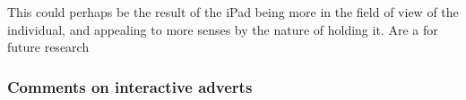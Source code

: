 	This could perhaps be the result of the iPad being more in the field of view of the individual, and appealing to more senses by the nature of holding it. Are a for future research
	

	\subsubsection{Comments on interactive adverts}
